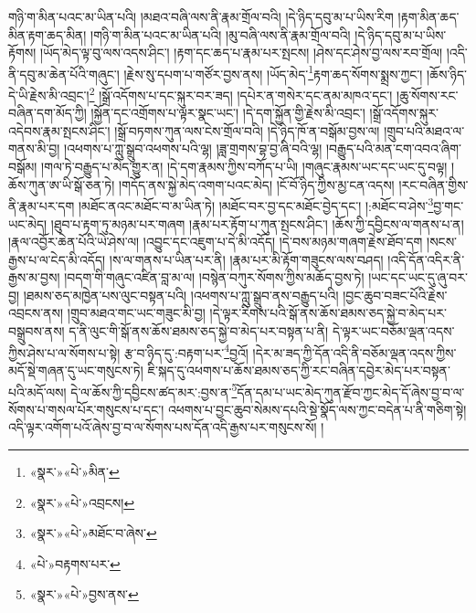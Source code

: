 གཉི་ག་མིན་པའང་མ་ཡིན་པའི། །མཐའ་བཞི་ལས་ནི་རྣམ་གྲོལ་བའི། །དེ་ཉིད་དབུ་མ་པ་ཡིས་རིག །རྟག་མིན་ཆད་མིན་རྟག་ཆད་མིན། །གཉི་ག་མིན་པའང་མ་ཡིན་པའི། །མུ་བཞི་ལས་ནི་རྣམ་གྲོལ་བའི། །དེ་ཉིད་དབུ་མ་པ་ཡིས་རྟོགས། །ཡོད་མེད་ལྟ་བུ་ལས་འདས་ཤིང་། །རྟག་དང་ཆད་པ་རྣམ་པར་སྤངས། །ཤེས་དང་ཤེས་བྱ་ལས་རབ་གྲོལ། །འདི་ནི་དབུ་མ་ཆེན་པོའི་གཞུང་། །རྗེས་སུ་དཔག་པ་གཙོར་བྱས་ནས། །ཡོད་མེད་\footnote{«སྣར་»«པེ་»མིན་}རྟག་ཆད་སོགས་སྨྲས་ཀྱང་། །ཆོས་ཉིད་དེ་ཡི་རྗེས་མི་འབྲང་།\footnote{«སྣར་»«པེ་»འབྲངས།} །སྒྲོ་འདོགས་པ་དང་སྐུར་བར་ཟད། །དཔེར་ན་གསེར་དང་ནམ་མཁའ་དང་། །ཆུ་སོགས་རང་བཞིན་དག་མོད་ཀྱི། །སྐྱོན་དང་འགྲོགས་པ་ལྟར་སྣང་ཡང་། །དེ་དག་སྐྱོན་གྱི་རྗེས་མི་འབྲང་། །སྒྲོ་འདོགས་སྐུར་འདེབས་རྣམ་སྤངས་ཤིང་། །སྒྲོ་བཏགས་ཀུན་ལས་ངེས་གྲོལ་བའི། །དེ་ཉིད་ཁོ་ན་བསྒོམ་བྱས་ལ། །གྲུབ་པའི་མཐའ་ལ་གནས་མི་བྱ། །འཕགས་པ་ཀླུ་སྒྲུབ་འཕགས་པའི་ལྷ། །ཟླ་གྲགས་བྷ་བྱ་ཞི་བའི་ལྷ། །བརྒྱུད་པའི་མན་ངག་འབའ་ཞིག་བསྒོམ། །གལ་ཏེ་བརྒྱུད་པ་མེད་གྱུར་ན། །དེ་དག་རྣམས་ཀྱིས་བཀོད་པ་ཡི། །གཞུང་རྣམས་ཡང་དང་ཡང་དུ་བལྟ། །ཆོས་ཀུན་ཨ་ཡི་སྒོ་ཅན་ཏེ། །གདོད་ནས་སྐྱེ་མེད་འགག་པའང་མེད། །ངོ་བོ་ཉིད་ཀྱིས་མྱ་ངན་འདས། །རང་བཞིན་གྱིས་ནི་རྣམ་པར་དག །མཐོང་ནའང་མཐོང་བ་མ་ཡིན་ཏེ། །མཐོང་བར་བྱ་དང་མཐོང་བྱེད་དང་། །:མཐོང་བ་ཤེས་\footnote{«སྣར་»«པེ་»མཐོང་བ་ཞེས་}བྱ་གང་ཡང་མེད། །ཐུབ་པ་རྟག་ཏུ་མཉམ་པར་གཞག །རྣམ་པར་རྟོག་པ་ཀུན་སྤངས་ཤིང་། །ཆོས་ཀྱི་དབྱིངས་ལ་གནས་པ་ན། །རྣལ་འབྱོར་ཆེན་པོའི་ཡེ་ཤེས་ལ། །འབྱུང་དང་འཇུག་པ་དེ་མི་འདོད། །དེ་བས་མཉམ་གཞག་རྗེས་ཐོབ་དག །སངས་རྒྱས་པ་ལ་ངེད་མི་འདོད། །ས་ལ་གནས་པ་ཡིན་པར་ནི། །རྣམ་པར་མི་རྟོག་གཟུངས་ལས་བཤད། །འདི་དོན་འདིར་ནི་རྒྱས་མ་བྱས། །བདག་གི་གཞུང་འཛིན་བླ་མ་ལ། །བསྙེན་བཀུར་སོགས་ཀྱིས་མཆོད་བྱས་ཏེ། །ཡང་དང་ཡང་དུ་ཞུ་བར་བྱ། །ཐམས་ཅད་མཁྱེན་པས་ལུང་བསྟན་པའི། །འཕགས་པ་ཀླུ་སྒྲུབ་ནས་བརྒྱུད་པའི། །བྱང་ཆུབ་བཟང་པོའི་རྗེས་འབྲངས་ནས། །གྲུབ་མཐའ་གང་ཡང་གཟུང་མི་བྱ། །དེ་ལྟར་རིགས་པའི་སྒོ་ནས་ཆོས་ཐམས་ཅད་སྐྱེ་བ་མེད་པར་བསྒྲུབས་ནས། ད་ནི་ལུང་གི་སྒོ་ནས་ཆོས་ཐམས་ཅད་སྐྱེ་བ་མེད་པར་བསྟན་པ་ནི། དེ་ལྟར་ཡང་བཅོམ་ལྡན་འདས་ཀྱིས་ཤེས་པ་ལ་སོགས་པ་སྟེ། རྩ་བ་ཉིད་དུ་:བརྟག་པར་\footnote{«པེ་»བརྟགས་པར་}བྱའོ། །དེར་མ་ཟད་ཀྱི་དོན་འདི་ནི་བཅོམ་ལྡན་འདས་ཀྱིས་མདོ་སྡེ་གཞན་དུ་ཡང་གསུངས་ཏེ། ཇི་སྐད་དུ་འཕགས་པ་ཆོས་ཐམས་ཅད་ཀྱི་རང་བཞིན་དབྱེར་མེད་པར་བསྟན་པའི་མདོ་ལས། དེ་ལ་ཆོས་ཀྱི་དབྱིངས་ཚད་མར་:བྱས་ན་\footnote{«སྣར་»«པེ་»བྱས་ནས་}དོན་དམ་པ་ཡང་མེད་ཀུན་རྫོབ་ཀྱང་མེད་དོ་ཞེས་བྱ་བ་ལ་སོགས་པ་གསལ་པོར་གསུངས་པ་དང་། འཕགས་པ་བྱང་ཆུབ་སེམས་དཔའི་སྡེ་སྣོད་ལས་ཀྱང་བདེན་པ་ནི་གཅིག་སྟེ། འདི་ལྟར་འགོག་པའོ་ཞེས་བྱ་བ་ལ་སོགས་པས་དོན་འདི་རྒྱས་པར་གསུངས་སོ། །
